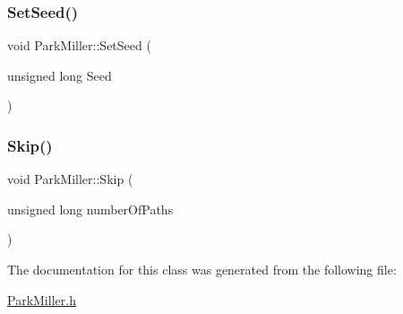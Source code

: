 \hypertarget{classParkMiller_a8ce7de074caf860ea6dfbaa99379a1e7}{}\label{classParkMiller_a8ce7de074caf860ea6dfbaa99379a1e7} 
\subsubsection{\texorpdfstring{Set\+Seed()}{SetSeed()}}
{\footnotesize\ttfamily void Park\+Miller\+::\+Set\+Seed (\begin{DoxyParamCaption}\item[{unsigned long}]{Seed }\end{DoxyParamCaption})}

\hypertarget{classParkMiller_a3d88f2c2e95baca1f5ac628705fa6f15}{}\label{classParkMiller_a3d88f2c2e95baca1f5ac628705fa6f15} 
\subsubsection{\texorpdfstring{Skip()}{Skip()}}
{\footnotesize\ttfamily void Park\+Miller\+::\+Skip (\begin{DoxyParamCaption}\item[{unsigned long}]{number\+Of\+Paths }\end{DoxyParamCaption})}



The documentation for this class was generated from the following file\+:\begin{DoxyCompactItemize}
\item 
\hyperlink{ParkMiller_8h}{Park\+Miller.\+h}\end{DoxyCompactItemize}
